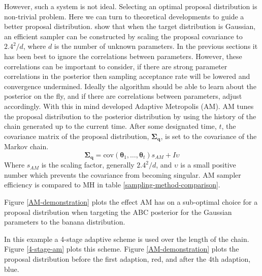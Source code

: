 However, such a system is not ideal. Selecting an optimal proposal distribution is non-trivial problem. Here we can turn to theoretical developments to guide a better proposal distribution. \citet{Gelman1996} show that when the target distribution is Gaussian, an efficient sampler can be constructed by scaling the proposal covariance to $2.4^2/d$, where $d$ is the number of unknown parameters. In the previous sections it has been best to ignore the correlations between parameters. However, these correlations can be important to consider, if there are strong parameter correlations in the posterior then sampling acceptance rate will be lowered and convergence undermined. Ideally the algorithm should be able to learn about the posterior on the fly, and if there are correlations between parameters, adjust accordingly. With this in mind \citet{haario2001} developed Adaptive Metropolis (AM). AM tunes the proposal distribution to the posterior distribution by using the history of the chain generated up to the current time. After some designated time, $t$, the covariance matrix of the proposal distribution, $\bm{\Sigma_q}$, is set to the covariance of the Markov chain. 
\begin{equation}
\bm{\Sigma_q} = \text{cov}(\bm{\theta}_1,\dots,\bm{\theta}_t)s_{AM} + I\upsilon
\end{equation}
Where $s_{AM}$ is the scaling factor, generally $2.4^2/d$, and $\upsilon$ is a small positive number which prevents the covariance from becoming singular. AM sampler efficiency is compared to MH in table \ref{sampling-method-comparison}.\par

Figure \ref{AM-demonstration} plots the effect AM has on a sub-optimal choice for a proposal distribution when targeting the ABC posterior for the Gaussian parameters to the banana distribution.\par

In this example a 4-stage adaptive scheme is used over the length of the chain. Figure \ref{4-stage-am} plots this scheme. Figure \ref{AM-demonstration} plots the proposal distribution before the first adaption, red, and after the 4th adaption, blue. \\
\linebreak
\linebreak
\linebreak


